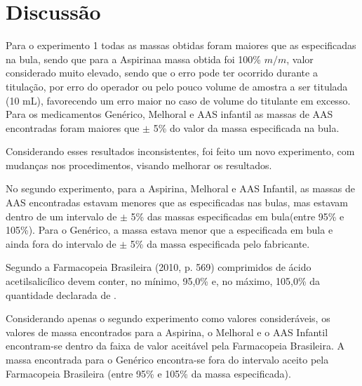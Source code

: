 \chapter{Discussão}

Para o experimento 1 todas as massas obtidas foram maiores que as especificadas na bula, sendo
que para a Aspirina\R \;a massa obtida foi 100\% $m/m$, valor considerado muito elevado, sendo que o
erro pode ter ocorrido durante a titulação, por erro do operador ou pelo pouco volume de amostra
a ser titulada (10 mL), favorecendo um erro maior no caso de volume do titulante em excesso.
Para os medicamentos Genérico, Melhoral e AAS infantil as massas de AAS encontradas foram
maiores que $\pm$ 5\% do valor da massa especificada na bula.

Considerando esses resultados inconsistentes, foi feito um novo experimento, com mudanças nos
procedimentos, visando melhorar os resultados.

No segundo experimento, para a Aspirina\R, Melhoral e AAS Infantil, as massas de AAS encontradas
estavam menores que as especificadas nas bulas, mas estavam dentro de um intervalo de $\pm$ 5\% das
massas especificadas em bula(entre 95\% e 105\%). Para o Genérico, a massa estava menor que a
especificada em bula e ainda fora do intervalo de $\pm$ 5\% da massa especificada pelo fabricante.

Segundo a Farmacopeia Brasileira (2010, p. 569) comprimidos de ácido acetilsalicílico devem conter,
no mínimo, 95,0\% e, no máximo, 105,0\% da quantidade declarada de .

Considerando apenas o segundo experimento como valores consideráveis, os valores de massa
encontrados para a Aspirina\R, o Melhoral e o AAS Infantil encontram-se dentro da faixa de valor
aceitável pela Farmacopeia Brasileira. A massa encontrada para o Genérico encontra-se fora do
intervalo aceito pela Farmacopeia Brasileira (entre 95\% e 105\% da massa especificada).
